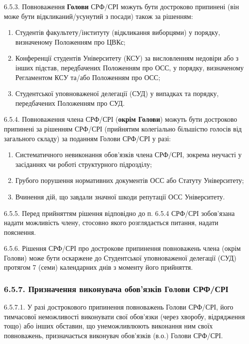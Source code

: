     6.5.3. Повноваження \textbf{Голови} СРФ/СРІ можуть бути достроково припинені (він може бути відкликаний/усунутий з посади) також за рішенням:

        \begin{enumerate}[label=\alph*)]
            \item Студентів факультету/інституту (відкликання виборцями) у порядку, визначеному Положенням про ЦВКс;
            \item Конференції студентів Університету (КСУ) за висловленням недовіри або з інших підстав, передбачених Положенням про ОСС, у порядку, визначеному Регламентом КСУ та/або Положенням про ОСС;
            \item Студентської уповноваженої делегації (СУД) у випадках та порядку, передбачених Положенням про СУД.
        \end{enumerate}

    6.5.4. Повноваження члена СРФ/СРІ (\textbf{окрім Голови}) можуть бути достроково припинені за рішенням СРФ/СРІ (прийнятим колегіально більшістю голосів від загального складу) за поданням Голови СРФ/СРІ у разі:

        \begin{enumerate}[label=\alph*)]
            \item Систематичного невиконання обов'язків члена СРФ/СРІ, зокрема неучасті у засіданнях чи роботі структурного підрозділу;
            \item Грубого порушення нормативних документів ОСС або Статуту Університету;
            \item Вчинення дій, що завдали значної шкоди репутації ОСС Університету.
        \end{enumerate}

    6.5.5. Перед прийняттям рішення відповідно до п. 6.5.4 СРФ/СРІ зобов'язана надати можливість члену, стосовно якого розглядається питання, надати пояснення.

    6.5.6. Рішення СРФ/СРІ про дострокове припинення повноважень члена (окрім Голови) може бути оскаржене до Студентської уповноваженої делегації (СУД) протягом 7 (семи) календарних днів з моменту його прийняття.

    \subsubsection*{6.5.7. Призначення виконувача обов'язків Голови СРФ/СРІ}
        6.5.7.1. У разі дострокового припинення повноважень Голови СРФ/СРІ, його тимчасової неможливості виконувати свої обов'язки (через хворобу, відрядження тощо) або інших обставин, що унеможливлюють виконання ним своїх повноважень, призначається виконувач обов'язків (в.о.) Голови СРФ/СРІ.
        

